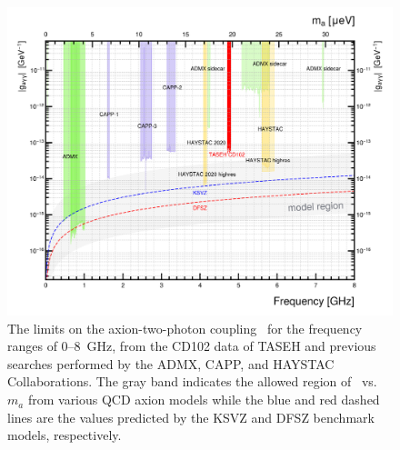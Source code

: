 \begin{figure} [htbp]
  \centering
 \includegraphics[width=12.9cm]{figures/RealData_limit_allexp.png}
  \caption{The limits on the axion-two-photon coupling \gagg\ for the 
frequency ranges of 0--8~GHz, from the CD102 data of TASEH and previous 
searches performed by the ADMX, CAPP, and HAYSTAC Collaborations. The gray 
band indicates the allowed region of \gagg\ vs. $m_a$ from various QCD axion 
models while the blue and red dashed lines are the values predicted by the 
KSVZ and DFSZ benchmark models, respectively.}
  \label{fig:gaggall}
\end{figure}


